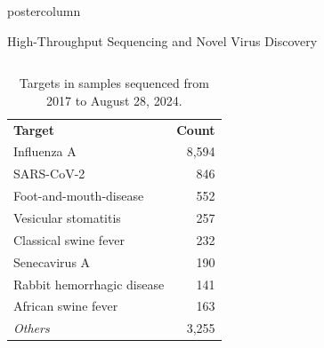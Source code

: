 \documentclass[final]{beamer}
\begin{document}
\begin{frame}
\begin{columns}
\begin{column}{.5\textwidth}
\begin{beamercolorbox}[center,wd=\textwidth]{postercolumn}
\begin{minipage}[T]{.95\textwidth}
{  \begin{block}{High-Throughput Sequencing and Novel Virus Discovery}
    \begin{columns}
    \begin{column}{.26\textwidth}
      \parbox[t]{\textwidth}{
      \begin{table}
      \caption{Targets in samples sequenced from 2017 to August 28, 2024.}
      \begin{tabular}{l r}
      \textbf{Target} & \textbf{Count} \\
      Influenza A & 8,594 \\
      SARS-CoV-2 & 846 \\
      Foot-and-mouth-disease & 552 \\
      Vesicular stomatitis & 257 \\
      Classical swine fever & 232 \\
      Senecavirus A & 190 \\
      Rabbit hemorrhagic disease & 141 \\
      African swine fever & 163 \\
      \emph{Others} & 3,255 \\
      \end{tabular}
      

\end{table}}
\end{column}
\end{columns}
\end{block}}
\end{minipage}
\end{beamercolorbox}
\end{column}
\end{columns}
\end{frame}
\end{document}
